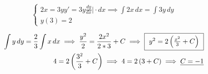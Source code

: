\documentclass[../rgr_2.tex]{subfiles}
\begin{document}
\Solution

\begin{equation}
	\begin{cases}
		2x=3yy'=3y\frac{dy}{dx} \Big|\cdot dx \implies \int 2x\,dx=\int 3y\,dy \\
		y(3)=2
	\end{cases}
\end{equation}

\begin{align}
	\int y\,dy=\frac{2}{3}\int x\,dx
	\implies
	\frac{y^2}{2}=\frac{2x^2}{2*3}+C
	\implies
	\fbox{
		$y^2=2\left(\frac{x^2}{3}+C\right)$
	}
	\\
	4=2\left(\frac{3^2}{3}+C\right)
	\implies
	4=2\left(3+C\right)
	\implies
	\underline{C=-1}
\end{align}

\end{document}
